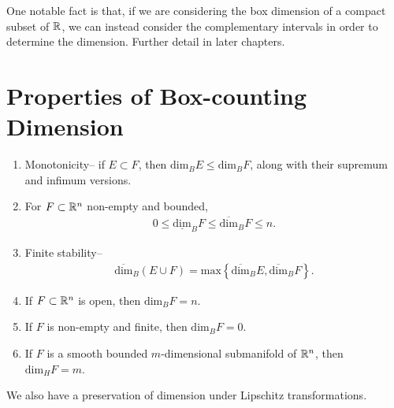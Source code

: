 \documentclass{memoir}
\begin{document}
One notable fact is that, if we are considering the box dimension of a compact subset of \(\mathbb{R}\), we can instead consider the complementary intervals in order to determine the dimension. Further detail in later chapters.

\section{Properties of Box-counting Dimension}
\label{sec:properties_of_box_counting_dimension}

\begin{enumerate}
	\item Monotonicity-- if \(E\subset F\), then \( \textrm{dim}_BE \leq \textrm{dim}_BF\), along with their supremum and infimum versions.
	\item For \(F\subset \mathbb{R}^{n}\) non-empty and bounded,
		\begin{align*}
			0 \leq \underline{ \textrm{dim}}_B F \leq \overline{ \textrm{dim}}_B F \leq n.
		\end{align*}
	\item Finite stability--
		\begin{align*}
			\overline{ \textrm{dim}}_B(E\cup F) = \textrm{max} \left\{ \overline{ \textrm{dim}}_B E, \overline{ \textrm{dim}}_B F \right\} .
		\end{align*}
	\item If \(F\subset \mathbb{R}^{n}\) is open, then \( \textrm{dim}_B F = n\).
	\item If \(F\) is non-empty and finite, then \( \textrm{dim}_B F = 0\).
	\item If \(F\) is a smooth bounded \(m\)-dimensional submanifold of \(\mathbb{R}^{n}\), then \( \textrm{dim}_H F = m\).
\end{enumerate}
We also have a preservation of dimension under Lipschitz transformations. 
\end{document}
